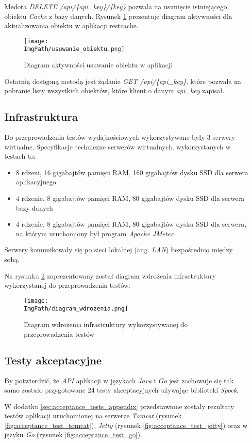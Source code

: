 Medota \textsl{DELETE /api/\{api\_key\}/\{key\}} pozwala na usunięcie istniejącego obiektu \textsl{Cache} z bazy danych. Rysunek \ref{fig:usuwanie_obiektu} prezentuje diagram aktywności dla aktualizowania obiektu w aplikacji restcache.
\begin{figure}[!ht]
\centering
\texttt{[image: \\ImgPath/usuwanie\_obiektu.png]}
\caption{Diagram aktywności usuwanie obiektu w aplikacji}
\label{fig:usuwanie_obiektu}
\end{figure}

Ostatnią dostępną metodą jest żądanie \textsl{GET /api/\{api\_key\}}, które pozwala na pobranie listy wszystkich obiektów, które klient o danym \textsl{api\_key} zapisał.


\newpage
\subsection{Infrastruktura}
Do przeprowadzenia testów wydajnościowych wykorzystywane były 3 serwery wirtualne. Specyfikacje techniczne serwerów wirtualnych, wykorzystanych w testach to: 
\begin{itemize}
    \item 8 rdzeni, 16 gigabajtów pamięci RAM, 160 gigabajtów dysku SSD dla serwera aplikacyjnego
    \item 4 rdzenie, 8 gigabajtów pamięci RAM, 80 gigabajtów dysku SSD dla serwera bazy danych 
    \item 4 rdzenie, 8 gigabajtów pamięci RAM, 80 gigabajtów dysku SSD dla serwera, na którym uruchomiony był program \textsl{Apache JMeter}
\end{itemize}
Serwery komunikowały się po sieci lokalnej (ang. \textsl{LAN}) bezpośrednio między sobą.

Na rysunku \ref{fig:deployment_diagram} zaprezentowany został diagram wdrożenia infrastruktury wykorzystanej do przeprowadzenia testów.
\begin{figure}[!ht]
\centering
\texttt{[image: \\ImgPath/diagram\_wdrozenia.png]}
\caption{Diagram wdrożenia infrastruktury wykorzystywanej do przeprowadzenia testów}
\label{fig:deployment_diagram}
\end{figure}
\subsection{Testy akceptacyjne} 

By potwierdzić, że \textsl{API} aplikacji w językach \textsl{Java} i \textsl{Go} jest zachowuje się tak samo zostało przygotowane 24 testy akceptacyjnych używając biblioteki \textsl{Spock}. 

W dodatku \ref{sec:acceptance_tests_appendix} przedstawione zostały rezultaty testów aplikacji uruchomionej na serwerze \textsl{Tomcat} (rysunek \ref{fig:acceptance_test_tomcat}), \textsl{Jetty} (rysunek \ref{fig:acceptance_test_jetty}) oraz w języku \textsl{Go} (rysunek \ref{fig:acceptance_test_go}).


